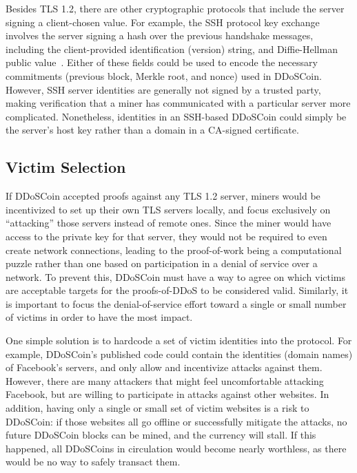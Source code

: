 Besides TLS 1.2, there are other cryptographic protocols that include the server
signing a client-chosen value. For example, the SSH protocol key exchange
involves the server signing a hash over the previous handshake messages,
including the client-provided identification (version) string, and
Diffie-Hellman public value~\cite{rfc4253}. Either of these fields could be used
to encode the necessary commitments (previous block, Merkle root, and nonce)
used in DDoSCoin.  However, SSH server identities are generally not signed by a
trusted party, making verification that a miner has communicated with a
particular server more complicated.  Nonetheless, identities in an SSH-based
DDoSCoin could simply be the server's host key rather than a domain in a
CA-signed certificate.

\subsection{Victim Selection}
\label{sec:victim}

If DDoSCoin accepted proofs against any TLS 1.2 server, miners would be
incentivized to set up their own TLS servers locally, and focus exclusively on
``attacking'' those servers instead of remote ones. Since the miner would have
access to the private key for that server, they would not be required to even
create network connections, leading to the proof-of-work being a computational
puzzle rather than one based on participation in a denial of service over a
network.
To prevent this, DDoSCoin must have a way to agree on which victims are
acceptable targets for the proofs-of-DDoS to be considered valid. Similarly, it
is important to focus the denial-of-service effort toward a single or small
number of victims in order to have the most impact.

One simple solution is to hardcode a set of victim identities into the
protocol.  For example, DDoSCoin's published code could contain the identities
(domain names)
of Facebook's servers, and only allow and incentivize attacks
against them. However, there are many attackers that might feel uncomfortable
attacking Facebook, but are willing to participate in attacks against other
websites. In addition, having only a single or small set of victim websites is a
risk to DDoSCoin: if those websites all go offline or successfully mitigate the
attacks, no future DDoSCoin blocks can be mined, and
the currency will stall. If this happened, all DDoSCoins in circulation would
become nearly worthless, as there would be no way to safely transact them.

